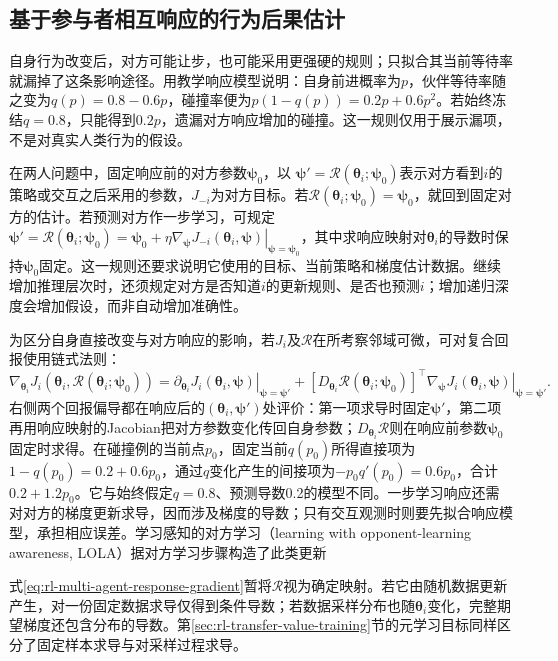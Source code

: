 \subsection{基于参与者相互响应的行为后果估计}
\label{sec:rl-multi-agent-response-model}

自身行为改变后，对方可能让步，也可能采用更强硬的规则；只拟合其当前等待率就漏掉了这条影响途径。用教学响应模型说明：自身前进概率为$p$，伙伴等待率随之变为$q(p)=0.8-0.6p$，碰撞率便为$p(1-q(p))=0.2p+0.6p^2$。若始终冻结$q=0.8$，只能得到$0.2p$，遗漏对方响应增加的碰撞。这一规则仅用于展示漏项，不是对真实人类行为的假设。

在两人问题中，固定响应前的对方参数$\bm\psi_0$，以
$\bm\psi'=\mathcal R(\bm\theta_i;\bm\psi_0)$表示对方看到$i$的策略或交互之后采用的参数，$J_{-i}$为对方目标。若$\mathcal R(\bm\theta_i;\bm\psi_0)=\bm\psi_0$，就回到固定对方的估计。若预测对方作一步学习，可规定
$\bm\psi'=\mathcal R(\bm\theta_i;\bm\psi_0)
=\bm\psi_0+\eta\left.\nabla_{\bm\psi}J_{-i}(\bm\theta_i,\bm\psi)\right|_{\bm\psi=\bm\psi_0}$，其中求响应映射对$\bm\theta_i$的导数时保持$\bm\psi_0$固定。这一规则还要求说明它使用的目标、当前策略和梯度估计数据。继续增加推理层次时，还须规定对方是否知道$i$的更新规则、是否也预测$i$；增加递归深度会增加假设，而非自动增加准确性。

为区分自身直接改变与对方响应的影响，若$J_i$及$\mathcal R$在所考察邻域可微，可对复合回报使用链式法则：
\begin{equation}
 \nabla_{\bm\theta_i}J_i(\bm\theta_i,\mathcal R(\bm\theta_i;\bm\psi_0))
 =
 \left.\partial_{\bm\theta_i}J_i(\bm\theta_i,\bm\psi)
       \right|_{\bm\psi=\bm\psi'}
 +[D_{\bm\theta_i}\mathcal R(\bm\theta_i;\bm\psi_0)]^\top
 \left.\nabla_{\bm\psi}J_i(\bm\theta_i,\bm\psi)
       \right|_{\bm\psi=\bm\psi'}.
 \label{eq:rl-multi-agent-response-gradient}
\end{equation}
右侧两个回报偏导都在响应后的$(\bm\theta_i,\bm\psi')$处评价：第一项求导时固定$\bm\psi'$，第二项再用响应映射的Jacobian把对方参数变化传回自身参数；$D_{\bm\theta_i}\mathcal R$则在响应前参数$\bm\psi_0$固定时求得。在碰撞例的当前点$p_0$，固定当前$q(p_0)$所得直接项为$1-q(p_0)=0.2+0.6p_0$，通过$q$变化产生的间接项为$-p_0q'(p_0)=0.6p_0$，合计$0.2+1.2p_0$。它与始终假定$q=0.8$、预测导数0.2的模型不同。一步学习响应还需对对方的梯度更新求导，因而涉及梯度的导数；只有交互观测时则要先拟合响应模型，承担相应误差。学习感知的对方学习（learning with opponent-learning awareness, LOLA）据对方学习步骤构造了此类更新

式\eqref{eq:rl-multi-agent-response-gradient}暂将$\mathcal R$视为确定映射。若它由随机数据更新产生，对一份固定数据求导仅得到条件导数；若数据采样分布也随$\bm\theta_i$变化，完整期望梯度还包含分布的导数。第\ref{sec:rl-transfer-value-training}节的元学习目标同样区分了固定样本求导与对采样过程求导。

